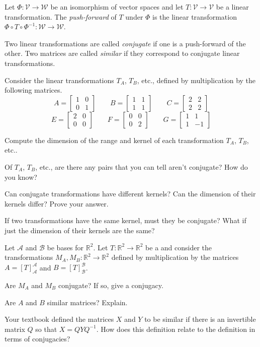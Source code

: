 \documentclass[14pt]{problemset}
\newcommand{\R}{\mathbb{R}}
\newcommand{\mat}[1]{\begin{bmatrix}#1\end{bmatrix}}
\begin{document}
	\begin{definition}
		Let $\Phi:\mathcal V\to\mathcal W$ be an isomorphism of vector spaces
		and let $T:\mathcal V\to\mathcal V$ be a linear transformation. The 
		\emph{push-forward} of $T$ under $\Phi$ is the linear transformation
		$\Phi\circ T\circ \Phi^{-1}:\mathcal W\to\mathcal W$.

		Two linear transformations are called \emph{conjugate} if one is a push-forward
		of the other. Two matrices are called \emph{similar} if they correspond to
		conjugate linear transformations.
	\end{definition}

	\question
	Consider the linear transformations $T_A$, $T_B$, etc., defined by multiplication
	by the following matrices.
	\[
		A=\mat{1&0\\0&1}\qquad B=\mat{1&1\\1&1}\qquad C=\mat{2&2\\2&2}
	\]
	\[
		E=\mat{2&0\\0&0}\qquad F=\mat{0&0\\0&2}\qquad G=\mat{1&1\\1&-1}
	\]
	\begin{parts}
		\item Compute the dimension of the range and kernel of each transformation $T_A$, $T_B$, etc..
		\item Of $T_A$, $T_B$, etc., are there any pairs that you can
			tell aren't conjugate? How do you know?
		\item Can conjugate transformations have different kernels? Can the dimension of their
			kernels differ? Prove your answer.
		\item If two transformations have the same kernel, must they be conjugate? What if just the dimension
			of their kernels are the same?
	\end{parts}
	
	\question
		Let $\mathscr A$ and $\mathscr B$ be bases for $\R^2$.
			Let $T:\R^2\to\R^2$ be a 
			and consider the transformations
			$M_A,M_B:\R^2\to\R^2$ defined by multiplication by the matrices $A=[T]_{\mathscr A}^{\mathscr A}$
			and $B=[T]_{\mathscr B}^{\mathscr B}$.
	\begin{parts}
		\item Are $M_A$ and $M_B$ conjugate? If so, give a conjugacy.
		\item Are $A$ and $B$ similar matrices? Explain.
		\item Your textbook defined the matrices $X$ and $Y$ to be similar if there is an invertible
			matrix $Q$ so that $X=QYQ^{-1}$. How does this definition relate
			to the definition in terms of conjugacies?
	\end{parts}
\end{document}
